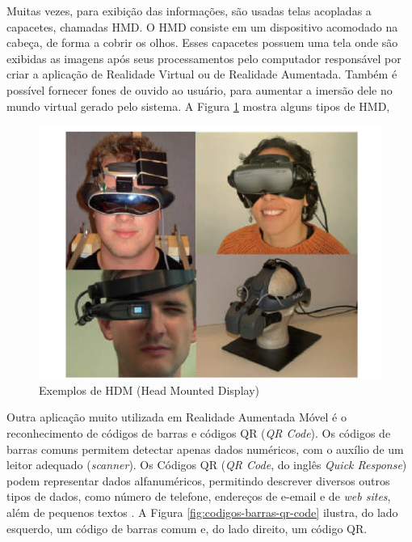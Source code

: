 \label{def:hmd}
Muitas vezes, para exibição das informações, são usadas telas acopladas a capacetes,
chamadas \gls{HMD}. O \gls{HMD} consiste em um dispositivo acomodado na cabeça, de forma a cobrir os olhos.
Esses capacetes possuem uma tela onde são exibidas as imagens após seus processamentos pelo computador
responsável por criar a aplicação de Realidade Virtual ou de Realidade Aumentada. Também é possível
fornecer fones de ouvido ao usuário, para aumentar a imersão dele no mundo virtual gerado pelo sistema.
A Figura \ref{fig:hmd_example} mostra alguns tipos de \gls{HMD},

\begin{figure}[h!]
    \centering
    \caption{Exemplos de HDM (Head Mounted Display)}
    \label{fig:hmd_example}
    \includegraphics[width=13cm]{resources/HMD.png}
\end{figure}


Outra aplicação muito utilizada em Realidade Aumentada Móvel é o reconhecimento de códigos de barras e códigos QR
(\textit{QR Code}). Os códigos de barras comuns permitem detectar apenas dados numéricos, com o auxílio de um
leitor adequado (\textit{scanner}). Os Códigos QR (\textit{QR Code}, do inglês \textit{Quick Response}) podem 
representar dados alfanuméricos, permitindo descrever diversos outros tipos de dados, como número de telefone,
endereços de e-email e de \textit{web sites}, além de pequenos textos \cite{QRCodeSite}. A Figura 
\ref{fig:codigos-barras-qr-code} ilustra, do lado esquerdo, um código de barras comum e, do lado direito, um 
código QR.

